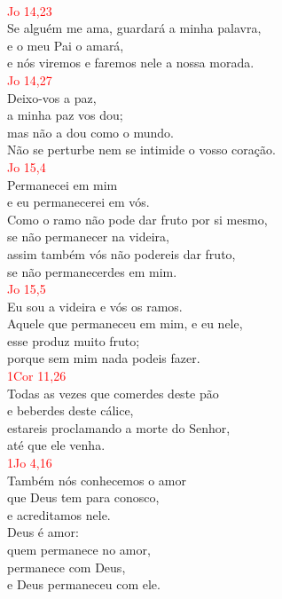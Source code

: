 \documentclass{book}
\begin{document}
\begin{flushleft}
    \vspace{.1cm} \\
    \textcolor{red}{Jo 14,23}
    \vspace{.1cm} \\
    Se alguém me ama, guardará a minha palavra, \\
    e o meu Pai o amará, \\
    e nós viremos e faremos nele a nossa morada.
    \vspace{.1cm} \\
    \textcolor{red}{Jo 14,27}
    \vspace{.1cm} \\
    Deixo-vos a paz, \\
    a minha paz vos dou; \\
    mas não a dou como o mundo. \\
    Não se perturbe nem se intimide o vosso coração.
    \vspace{.1cm} \\
    \textcolor{red}{Jo 15,4}
    \vspace{.1cm} \\
    Permanecei em mim \\
    e eu permanecerei em vós. \\
    Como o ramo não pode dar fruto por si mesmo, \\
    se não permanecer na videira, \\
    assim também vós não podereis dar fruto, \\
    se não permanecerdes em mim.
    \vspace{.1cm} \\
    \textcolor{red}{Jo 15,5}
    \vspace{.1cm} \\
    Eu sou a videira e vós os ramos. \\
    Aquele que permaneceu em mim, e eu nele, \\
    esse produz muito fruto; \\
    porque sem mim nada podeis fazer.
    \vspace{.1cm} \\
    \textcolor{red}{1Cor 11,26}
    \vspace{.1cm} \\
    Todas as vezes que comerdes deste pão \\
    e beberdes deste cálice, \\
    estareis proclamando a morte do Senhor, \\
    até que ele venha.
    \vspace{.1cm} \\
    \textcolor{red}{1Jo 4,16}
    \vspace{.1cm} \\
    Também nós conhecemos o amor \\
    que Deus tem para conosco, \\
    e acreditamos nele. \\
    Deus é amor: \\
    quem permanece no amor, \\
    permanece com Deus, \\
    e Deus permaneceu com ele.
\end{flushleft}
\end{document}
